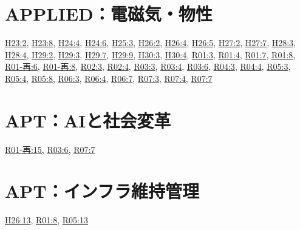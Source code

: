\section{APPLIED：電磁気・物性}
\hyperref[q:h23-reg-applied-02]{H23:2}, \hyperref[q:h23-reg-applied-08]{H23:8}, \hyperref[q:h24-reg-applied-04]{H24:4}, \hyperref[q:h24-reg-applied-06]{H24:6}, \hyperref[q:h25-reg-applied-03]{H25:3}, \hyperref[q:h26-reg-applied-02]{H26:2}, \hyperref[q:h26-reg-applied-04]{H26:4}, \hyperref[q:h26-reg-applied-05]{H26:5}, \hyperref[q:h27-reg-applied-02]{H27:2}, \hyperref[q:h27-reg-applied-07]{H27:7}, \hyperref[q:h28-reg-applied-03]{H28:3}, \hyperref[q:h28-reg-applied-04]{H28:4}, \hyperref[q:h29-reg-applied-02]{H29:2}, \hyperref[q:h29-reg-applied-03]{H29:3}, \hyperref[q:h29-reg-applied-07]{H29:7}, \hyperref[q:h29-reg-applied-09]{H29:9}, \hyperref[q:h30-reg-applied-03]{H30:3}, \hyperref[q:h30-reg-applied-04]{H30:4}, \hyperref[q:r01-reg-applied-03]{R01:3}, \hyperref[q:r01-reg-applied-04]{R01:4}, \hyperref[q:r01-reg-applied-07]{R01:7}, \hyperref[q:r01-reg-applied-08]{R01:8}, \hyperref[q:r01-ret-applied-06]{R01-再:6}, \hyperref[q:r01-ret-applied-08]{R01-再:8}, \hyperref[q:r02-reg-applied-03]{R02:3}, \hyperref[q:r02-reg-applied-04]{R02:4}, \hyperref[q:r03-reg-applied-03]{R03:3}, \hyperref[q:r03-reg-applied-04]{R03:4}, \hyperref[q:r03-reg-applied-06]{R03:6}, \hyperref[q:r04-reg-applied-03]{R04:3}, \hyperref[q:r04-reg-applied-04]{R04:4}, \hyperref[q:r05-reg-applied-03]{R05:3}, \hyperref[q:r05-reg-applied-04]{R05:4}, \hyperref[q:r05-reg-applied-08]{R05:8}, \hyperref[q:r06-reg-applied-03]{R06:3}, \hyperref[q:r06-reg-applied-04]{R06:4}, \hyperref[q:r06-reg-applied-07]{R06:7}, \hyperref[q:r07-reg-applied-03]{R07:3}, \hyperref[q:r07-reg-applied-04]{R07:4}, \hyperref[q:r07-reg-applied-07]{R07:7}
\section{APT：AIと社会変革}
\hyperref[q:r01-ret-apt-15]{R01-再:15}, \hyperref[q:r03-reg-apt-06]{R03:6}, \hyperref[q:r07-reg-apt-07]{R07:7}
\section{APT：インフラ維持管理}
\hyperref[q:h26-reg-apt-13]{H26:13}, \hyperref[q:r01-reg-apt-08]{R01:8}, \hyperref[q:r05-reg-apt-13]{R05:13}
